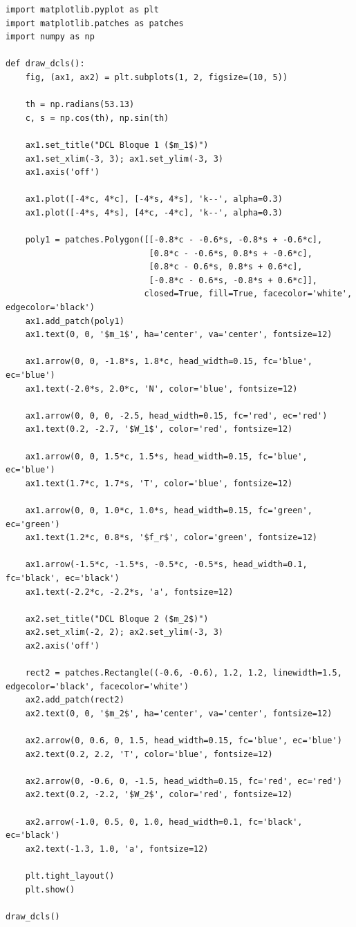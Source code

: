 \documentclass[12pt, a4paper]{article}
\begin{document}
\begin{lstlisting}
import matplotlib.pyplot as plt
import matplotlib.patches as patches
import numpy as np

def draw_dcls():
    fig, (ax1, ax2) = plt.subplots(1, 2, figsize=(10, 5))
    
    th = np.radians(53.13)
    c, s = np.cos(th), np.sin(th)
    
    ax1.set_title("DCL Bloque 1 ($m_1$)")
    ax1.set_xlim(-3, 3); ax1.set_ylim(-3, 3)
    ax1.axis('off')
    
    ax1.plot([-4*c, 4*c], [-4*s, 4*s], 'k--', alpha=0.3)
    ax1.plot([-4*s, 4*s], [4*c, -4*c], 'k--', alpha=0.3)
    
    poly1 = patches.Polygon([[-0.8*c - -0.6*s, -0.8*s + -0.6*c], 
                             [0.8*c - -0.6*s, 0.8*s + -0.6*c], 
                             [0.8*c - 0.6*s, 0.8*s + 0.6*c], 
                             [-0.8*c - 0.6*s, -0.8*s + 0.6*c]], 
                            closed=True, fill=True, facecolor='white', edgecolor='black')
    ax1.add_patch(poly1)
    ax1.text(0, 0, '$m_1$', ha='center', va='center', fontsize=12)
    
    ax1.arrow(0, 0, -1.8*s, 1.8*c, head_width=0.15, fc='blue', ec='blue')
    ax1.text(-2.0*s, 2.0*c, 'N', color='blue', fontsize=12)
    
    ax1.arrow(0, 0, 0, -2.5, head_width=0.15, fc='red', ec='red')
    ax1.text(0.2, -2.7, '$W_1$', color='red', fontsize=12)
    
    ax1.arrow(0, 0, 1.5*c, 1.5*s, head_width=0.15, fc='blue', ec='blue')
    ax1.text(1.7*c, 1.7*s, 'T', color='blue', fontsize=12)
    
    ax1.arrow(0, 0, 1.0*c, 1.0*s, head_width=0.15, fc='green', ec='green')
    ax1.text(1.2*c, 0.8*s, '$f_r$', color='green', fontsize=12)
    
    ax1.arrow(-1.5*c, -1.5*s, -0.5*c, -0.5*s, head_width=0.1, fc='black', ec='black')
    ax1.text(-2.2*c, -2.2*s, 'a', fontsize=12)
    
    ax2.set_title("DCL Bloque 2 ($m_2$)")
    ax2.set_xlim(-2, 2); ax2.set_ylim(-3, 3)
    ax2.axis('off')
    
    rect2 = patches.Rectangle((-0.6, -0.6), 1.2, 1.2, linewidth=1.5, edgecolor='black', facecolor='white')
    ax2.add_patch(rect2)
    ax2.text(0, 0, '$m_2$', ha='center', va='center', fontsize=12)
    
    ax2.arrow(0, 0.6, 0, 1.5, head_width=0.15, fc='blue', ec='blue')
    ax2.text(0.2, 2.2, 'T', color='blue', fontsize=12)
    
    ax2.arrow(0, -0.6, 0, -1.5, head_width=0.15, fc='red', ec='red')
    ax2.text(0.2, -2.2, '$W_2$', color='red', fontsize=12)
    
    ax2.arrow(-1.0, 0.5, 0, 1.0, head_width=0.1, fc='black', ec='black')
    ax2.text(-1.3, 1.0, 'a', fontsize=12)

    plt.tight_layout()
    plt.show()

draw_dcls()
\end{lstlisting}
\end{document}
